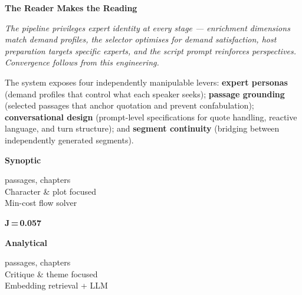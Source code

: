 \documentclass[landscape]{article}
\newcommand{\sectionheadsize}{\fontsize{30}{36}\selectfont}
\newcommand{\subsectionheadsize}{\fontsize{23}{28}\selectfont}
\newcommand{\bodysize}{\fontsize{20}{26}\selectfont}
\newcommand{\smallbody}{\fontsize{18}{23}\selectfont}
\newcommand{\tinytext}{\fontsize{15}{20}\selectfont}
\newcommand{\postersection}[1]{%
  \vspace{2pt}%
  {\sffamily\bfseries\sectionheadsize\color{burgundy}#1}\par\nobreak
  \vspace{-4pt}{\color{gold}\rule{1.8in}{2.5pt}}\par
  \vspace{2pt}%
}
\begin{document}
%
\begin{minipage}[t]{0.375\textwidth}

\begin{tcolorbox}[posterbox]
\postersection{The Reader Makes the Reading}

{\bodysize\itshape\color{warmgray}%
  The pipeline privileges expert identity at every stage --- enrichment
  dimensions match demand profiles, the selector optimises for demand
  satisfaction, host preparation targets specific experts, and the script
  prompt reinforces perspectives. Convergence follows from this engineering.}

\bodysize
The system exposes four independently manipulable levers:
\textbf{expert personas} (demand profiles that control what each speaker
seeks); \textbf{passage grounding} (selected passages that anchor
quotation and prevent confabulation); \textbf{conversational design}
(prompt-level specifications for quote handling, reactive language, and
turn structure); and \textbf{segment continuity} (bridging between
independently generated segments).

\vspace{6pt}

\begin{minipage}[t]{0.42\linewidth}
\begin{tcolorbox}[enhanced, colback=tealpale!50, colframe=teal!30,
  boxrule=1pt, arc=3pt, left=6pt, right=6pt, top=6pt, bottom=6pt]
  {\sffamily\bfseries\subsectionheadsize\color{teal}Synoptic}\par
  \smallbody {\ttfamily 59} passages, {} chapters\\
  Character \& plot focused\\
  Min-cost flow solver
\end{tcolorbox}
\end{minipage}\hfill
\begin{minipage}[t]{0.13\linewidth}\centering
  \vspace{16pt}
  {\sffamily\bfseries\fontsize{17}{20}\selectfont\color{burgundy}J\,=\,0.057}\par
  \vspace{2pt}{\tinytext\color{warmgray}${<}6\%$ overlap\\in passages}
\end{minipage}\hfill
\begin{minipage}[t]{0.42\linewidth}
\begin{tcolorbox}[enhanced, colback=goldpale!50, colframe=gold!40,
  boxrule=1pt, arc=3pt, left=6pt, right=6pt, top=6pt, bottom=6pt]
  {\sffamily\bfseries\subsectionheadsize\color{gold}Analytical}\par
  \smallbody {\ttfamily 32} passages, {} chapters\\
  Critique \& theme focused\\
  Embedding retrieval + LLM
\end{tcolorbox}
\end{minipage}


\end{tcolorbox}
\end{minipage}
\end{document}
